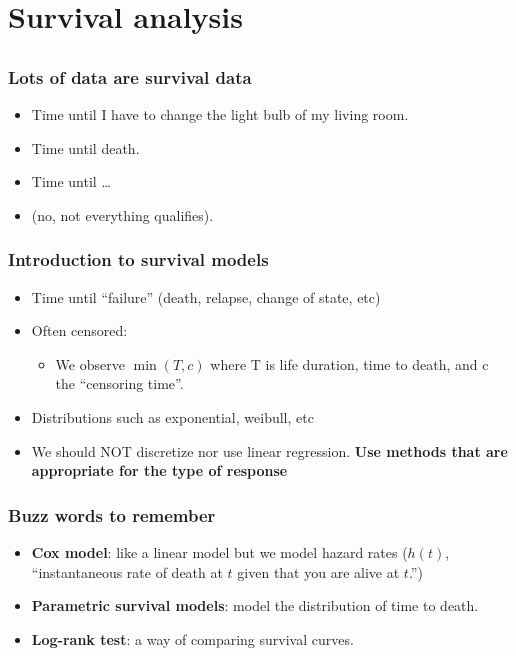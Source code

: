 \section[Survival]{Survival analysis}
\subsection{}
\begin{frame}
  \frametitle{Lots of data are survival data}
  \begin{itemize}
  \item Time until I have to change the light bulb of my living room.
  \item Time until death.
  \item Time until \ldots
  \item (no, not everything qualifies).
  \end{itemize}
\end{frame}



\begin{frame}
\frametitle{Introduction to survival models}
\begin{itemize}
\item Time until ``failure'' (death, relapse, change of state, etc)
\item Often censored:
  \begin{itemize}
  \item We observe $\min(T, c)$  where T is life duration, time to death, and
  c the ``censoring time''.
  \end{itemize}
\item Distributions such as exponential, weibull, etc
\item We should NOT discretize nor use linear regression. \textbf{Use
    methods that are appropriate for the type of response}
\end{itemize}
\end{frame}



\begin{frame}
  \frametitle{Buzz words to remember}
  \begin{itemize}
  \item \textbf{Cox model}: like a linear model but we model hazard rates ($h(t)$,
    ``instantaneous rate of death at $t$ given that you are alive at $t$.'')
  \item \textbf{Parametric survival models}: model the distribution of
    time to death.
  \item \textbf{Log-rank test}: a way of comparing survival curves. 
  \end{itemize}
\end{frame}




